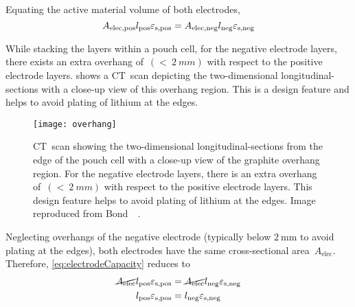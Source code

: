 Equating  the active material volume of both electrodes,
\begin{equation}
    A_\text{elec,pos}l_\text{pos}  \varepsilon_\text{s,pos} = A_\text{elec,neg}l_\text{neg}  \varepsilon_\text{s,neg} \label{eq:electrodeCapacity}\\
\end{equation}

While  stacking the  layers  within a  pouch cell,  for  the negative  electrode
layers, there exists  an extra overhang of~${(<~\SI{2}{mm})}$ with  respect to the
positive  electrode layers.    shows a  CT~scan
depicting the two-dimensional longitudinal-sections with a close-up view of this
overhang region. This is a design feature  and helps to avoid plating of lithium
at the edges.

\begin{figure}[!htbp]
    \centering
    \texttt{[image: overhang]}
    \caption[Stacking of layers within a pouch cell showing overhang of negative
    electrode]
    {CT~scan showing the two-dimensional longitudinal-sections from the edge of
        the pouch cell with a close-up view of the graphite overhang region. For
        the negative electrode layers, there is an extra overhang of~${(<~\SI{2}{mm})}$ with respect to the positive electrode layers. This
        design feature helps to avoid plating of lithium at the edges. Image
    reproduced from Bond~\etal~\cite{Bond2017}.}
    \label{fig:anodeoverhangpouchcell}
\end{figure}

Neglecting   overhangs    of   the    negative   electrode    (typically   below
$\SI{2}{\milli\meter}$    to    avoid    plating    at    the    edges),    both
electrodes  have  the   same  cross-sectional  area~$A_\text{elec}$.  Therefore,
\cref{eq:electrodeCapacity} reduces to
\begin{align}
    \cancel{A_\text{elec}}l_\text{pos}  \varepsilon_\text{s,pos} & = \cancel{A_\text{elec}}l_\text{neg}  \varepsilon_\text{s,neg}  \\
    l_\text{pos}  \varepsilon_\text{s,pos}                       & = l_\text{neg}  \varepsilon_\text{s,neg}\label{eq:electrodeCapequalarea}
\end{align}


